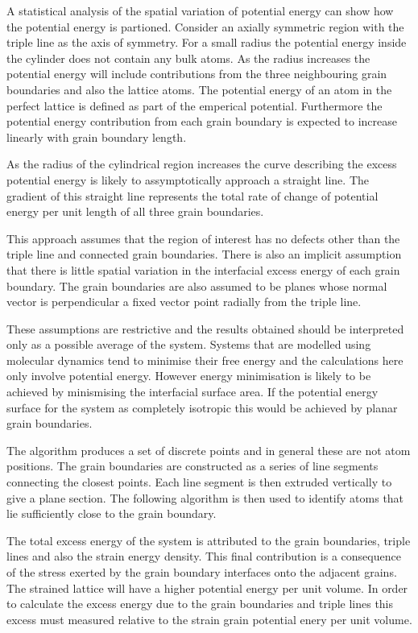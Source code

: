 \documentclass[12pt,a4paper]{book}
\begin{document}
A statistical analysis of the spatial variation of potential energy can show how the potential energy is partioned. Consider an axially symmetric region with the triple line as the axis of symmetry. For a small radius the potential energy inside the cylinder does not contain any bulk atoms. As the radius increases the potential energy will include contributions from the three neighbouring grain boundaries and also the lattice atoms. The potential energy of an atom in the perfect lattice is defined as part of the emperical potential. Furthermore the potential energy contribution from each grain boundary is expected to increase linearly with grain boundary length. 

As the radius of the cylindrical region increases the curve describing the excess potential energy is likely to assymptotically approach a straight line. The gradient of this straight line represents the total rate of change of potential energy per unit length of all three grain boundaries. 

This approach assumes that the region of interest has no defects other than the triple line and connected grain boundaries. There is also an implicit assumption that there is little spatial variation in the interfacial excess energy of each grain boundary. The grain boundaries are also assumed to be planes whose normal vector is perpendicular a fixed vector point radially from the triple line.

These assumptions are restrictive and the results obtained should be interpreted only as a possible average of the system. Systems that are modelled using molecular dynamics tend to minimise their free energy and the calculations here only involve potential energy. However energy minimisation is likely to be achieved by minismising the interfacial surface area. If the potential energy surface for the system as completely isotropic this would be achieved by planar grain boundaries.    

The algorithm produces a set of discrete points and in general these are not atom positions. The grain boundaries are constructed as a series of line segments connecting the closest points. Each line segment is then extruded vertically to give a plane section. The following algorithm is then used to identify atoms that lie sufficiently close to the grain boundary.

The total excess energy of the system is attributed to the grain boundaries, triple lines and also the strain energy density. This final contribution is a consequence of the stress exerted by the grain boundary interfaces onto the adjacent grains. The strained lattice will have a higher potential energy per unit volume. In order to calculate the excess energy due to the grain boundaries and triple lines this excess must measured relative to the strain grain potential enery per unit volume. 
\end{document}
